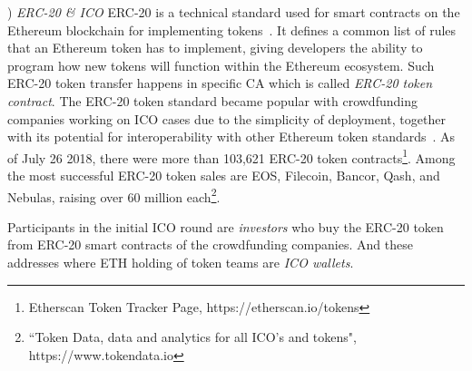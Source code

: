 

 



) \emph{ERC-20 \& ICO}
ERC-20 is a technical standard used for smart contracts on the Ethereum blockchain for implementing tokens~\cite{erc-20-wiki}. It defines a common list of rules that an Ethereum token has to implement, giving developers the ability to program how new tokens will function within the Ethereum ecosystem. Such ERC-20 token transfer happens in specific CA which is called \emph{ERC-20 token contract}. The ERC-20 token standard became popular with crowdfunding companies working on ICO cases due to the simplicity of deployment, together with its potential for interoperability with other Ethereum token standards~\cite{erc-20}. As of July 26 2018, there were more than 103,621 ERC-20 token contracts\footnote{Etherscan Token Tracker Page, https://etherscan.io/tokens}. Among the most successful ERC-20 token sales are EOS, Filecoin, Bancor, Qash, and Nebulas, raising over 60 million each\footnote{``Token Data, data and analytics for all ICO's and tokens", https://www.tokendata.io}.

Participants in the initial ICO round are \emph{investors} who buy the ERC-20 token from ERC-20 smart contracts of the crowdfunding companies. And these addresses where ETH holding of token teams are \emph{ICO wallets}.

